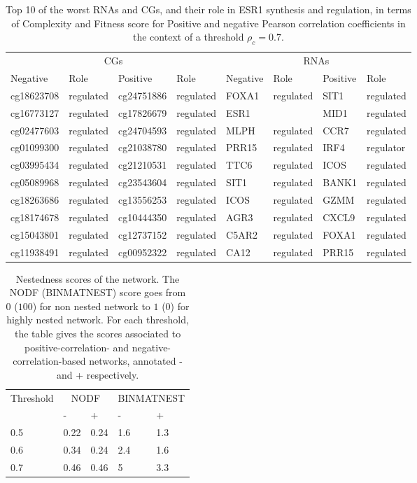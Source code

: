 \documentclass[10pt,a4paper]{article}
\begin{document}
 \begin{table}[h!]
\centering
\caption{\label{tab:tab6}Top 10 of the worst RNAs and CGs, and their role in ESR1 synthesis and regulation, in terms of Complexity and Fitness score for Positive and negative Pearson correlation coefficients in the context of a threshold $\rho_{c} = 0.7$.}
\begin{tabular}{|ll|ll|ll|ll|}
\cline{1-8}
\multicolumn{4}{|c}{CGs}&\multicolumn{4}{c|}{RNAs}\\
\cline{1-8}
Negative & Role & Positive & Role & Negative & Role & Positive & Role\\
\cline{1-8}
cg18623708 & regulated & cg24751886 & regulated & FOXA1 & regulated & SIT1 & regulated\\
cg16773127 & regulated & cg17826679 & regulated & ESR1 & & MID1 & regulated\\
cg02477603 & regulated & cg24704593 & regulated & MLPH & regulated & CCR7 & regulated\\
cg01099300 & regulated & cg21038780 & regulated & PRR15 & regulated & IRF4 & regulator\\
cg03995434 & regulated & cg21210531 & regulated & TTC6 & regulated & ICOS & regulated\\
cg05089968 & regulated & cg23543604 & regulated & SIT1 & regulated & BANK1 & regulated\\
cg18263686 & regulated & cg13556253 & regulated & ICOS & regulated & GZMM & regulated\\
cg18174678 & regulated & cg10444350 & regulated & AGR3 & regulated & CXCL9 & regulated\\
cg15043801 & regulated & cg12737152 & regulated & C5AR2 & regulated & FOXA1 & regulated\\
cg11938491 & regulated & cg00952322 & regulated & CA12 & regulated & PRR15 & regulated\\
\cline{1-8}
\end{tabular}
\end{table}
 \begin{table}[h!]
\centering
\caption{\label{tab:tab1}Nestedness scores of the network. The NODF (BINMATNEST) score goes from $0$ ($100$) for non nested network to $1$ ($0$) for highly nested network. For each threshold, the table gives the scores associated to positive-correlation- and negative-correlation-based networks, annotated - and + respectively.}
\begin{tabular}{|l|l|l|l|l|}
\cline{1-5}
\multirow{2}{*}{Threshold} & \multicolumn{2}{c|}{NODF} & \multicolumn{2}{c|}{BINMATNEST}\\
\cline{2-5}
&-&+&-&+\\
\cline{1-5}
0.5 & 0.22 & 0.24 & 1.6 & 1.3\\
0.6 & 0.34 & 0.24 & 2.4 & 1.6 \\
0.7 & 0.46 & 0.46 & 5 & 3.3\\
\cline{1-5}
\end{tabular}
\end{table}
\clearpage
\printbibliography
	
\end{document}
